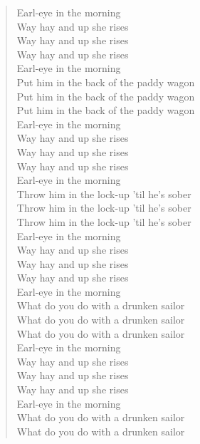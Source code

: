 \documentclass[11pt]{article}
\begin{document}
\begin{verse}
Earl-eye in the morning\\
\vspace*{1em}
Way hay and up she rises\\
Way hay and up she rises\\
Way hay and up she rises\\
Earl-eye in the morning\\
\vspace*{1em}
Put him in the back of the paddy wagon\\
Put him in the back of the paddy wagon\\
Put him in the back of the paddy wagon\\
Earl-eye in the morning\\
\vspace*{1em}
Way hay and up she rises\\
Way hay and up she rises\\
Way hay and up she rises\\
Earl-eye in the morning\\
\vspace*{1em}
Throw him in the lock-up 'til he's sober\\
Throw him in the lock-up 'til he's sober\\
Throw him in the lock-up 'til he's sober\\
Earl-eye in the morning\\
\vspace*{1em}
Way hay and up she rises\\
Way hay and up she rises\\
Way hay and up she rises\\
Earl-eye in the morning\\
\vspace*{1em}
What do you do with a drunken sailor\\
What do you do with a drunken sailor\\
What do you do with a drunken sailor\\
Earl-eye in the morning\\
\vspace*{1em}
Way hay and up she rises\\
Way hay and up she rises\\
Way hay and up she rises\\
Earl-eye in the morning\\
\vspace*{1em}
What do you do with a drunken sailor\\
What do you do with a drunken sailor\\

\end{verse}
\end{document}
